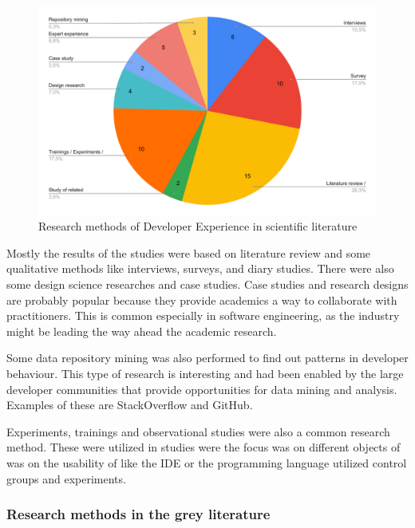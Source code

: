 \documentclass[english, 12pt, a4paper, sci, utf8, a-1b, online]{aaltothesis}
\begin{document}
\begin{figure}[ht]
  \captionsetup{width=0.6\textwidth}
  \caption{Research methods of Developer Experience in scientific literature}
  \begin{center}
    \includegraphics[width=\textwidth]{research-methods-scientific.pdf}
  \end{center}
\end{figure}

Mostly the results of the studies were based on literature review and some qualitative methods like interviews, surveys, and diary studies. There were also some design science researches and case studies. Case studies and research designs are probably popular because they provide academics a way to collaborate with practitioners. This is common especially in software engineering, as the industry might be leading the way ahead the academic research.

Some data repository mining was also performed to find out patterns in developer behaviour. This type of research is interesting and had been enabled by the large developer communities that provide opportunities for data mining and analysis. Examples of these are StackOverflow and GitHub.

Experiments, trainings and observational studies were also a common research method. These were utilized in studies were the focus was on different objects of  was on the usability of  like the IDE or the programming language utilized control groups and experiments.

\subsubsection{Research methods in the grey literature}
\end{document}
